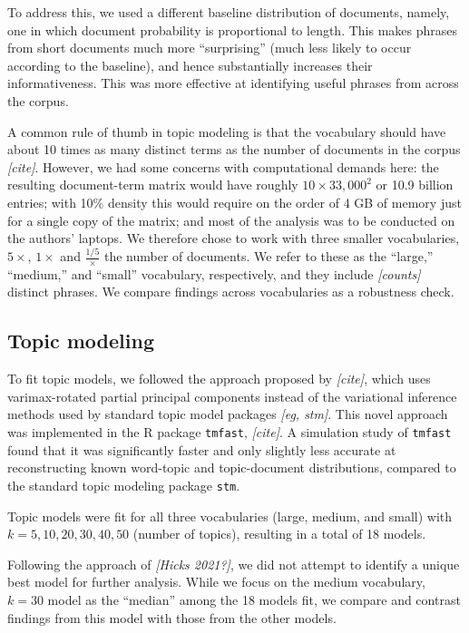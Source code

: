 \documentclass[12pt]{article}
\begin{document}
To address this, we used a different baseline distribution of documents,
namely, one in which document probability is proportional to length.
This makes phrases from short documents much more ``surprising'' (much
less likely to occur according to the baseline), and hence substantially
increases their informativeness. This was more effective at identifying
useful phrases from across the corpus.

A common rule of thumb in topic modeling is that the vocabulary should
have about 10 times as many distinct terms as the number of documents in
the corpus \emph{{[}cite{]}}. However, we had some concerns with
computational demands here: the resulting document-term matrix would
have roughly \(10 \times 33,000^2\) or 10.9 billion entries; with 10\%
density this would require on the order of 4 GB of memory just for a
single copy of the matrix; and most of the analysis was to be conducted
on the authors' laptops. We therefore chose to work with three smaller
vocabularies, \(5 \times\), \(1 \times\) and \(\frac{1/5} \times\) the
number of documents. We refer to these as the ``large,'' ``medium,'' and
``small'' vocabulary, respectively, and they include \emph{{[}counts{]}}
distinct phrases. We compare findings across vocabularies as a
robustness check.

\hypertarget{topic-modeling}{%
\subsection*{Topic modeling}\label{topic-modeling}}

To fit topic models, we followed the approach proposed by
\emph{{[}cite{]}}, which uses varimax-rotated partial principal
components instead of the variational inference methods used by standard
topic model packages \emph{{[}eg, stm{]}}. This novel approach was
implemented in the R package \texttt{tmfast}, \emph{{[}cite{]}}. A
simulation study of \texttt{tmfast} found that it was significantly
faster and only slightly less accurate at reconstructing known
word-topic and topic-document distributions, compared to the standard
topic modeling package \texttt{stm}.

Topic models were fit for all three vocabularies (large, medium, and
small) with \(k = 5, 10, 20, 30, 40, 50\) (number of topics), resulting
in a total of 18 models.

Following the approach of \emph{{[}Hicks 2021?{]}}, we did not attempt
to identify a unique best model for further analysis. While we focus on
the medium vocabulary, \(k=30\) model as the ``median'' among the 18
models fit, we compare and contrast findings from this model with those
from the other models.
\end{document}

